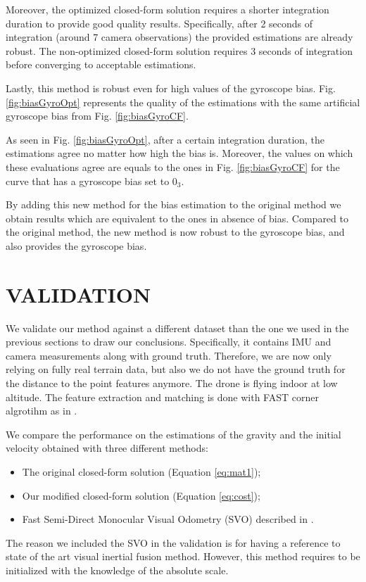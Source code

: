 \documentclass[letterpaper, 10 pt, conference]{ieeeconf}  %
\begin{document}
Moreover, the optimized closed-form solution requires a shorter integration duration to provide good quality results.
Specifically, after 2 seconds of integration (around 7 camera observations) the provided estimations are already robust.
The non-optimized closed-form solution requires 3 seconds of integration before converging to acceptable estimations.


Lastly, this method is robust even for high values of the gyroscope bias.
Fig. \ref{fig:biasGyroOpt} represents the quality of the estimations with the same artificial gyroscope bias from Fig. \ref{fig:biasGyroCF}.



As seen in Fig. \ref{fig:biasGyroOpt}, after a certain integration duration, the estimations agree no matter how high the bias is.
Moreover, the values on which these evaluations agree are equals to the ones in Fig. \ref{fig:biasGyroCF} for the curve that has a gyroscope bias set to $0_3$.


By adding this new method for the bias estimation to the original method we obtain results which are equivalent to the ones in absence of bias.
Compared to the original method, the new method is now robust to the gyroscope bias, and also provides the gyroscope bias.

\section{VALIDATION}

We validate our method against a different dataset than the one we used in the previous sections to draw our conclusions.
Specifically, it contains IMU and camera measurements along with ground truth.
Therefore, we are now only relying on fully real terrain data,
but also we do not have the ground truth for the distance to the point features anymore.
The drone is flying indoor at low altitude.
The feature extraction and matching is done with FAST corner algrotihm as in \cite{Forster2014}.

We compare the performance on the estimations of the gravity and the initial velocity obtained with three different methods:
\begin{itemize}
\item The original closed-form solution (Equation \ref{eq:mat1});
\item Our modified closed-form solution (Equation \ref{eq:cost});
\item Fast Semi-Direct Monocular Visual Odometry (SVO) described in \cite{Forster2014}.
\end{itemize}
The reason we included the SVO in the validation is for having a reference to state of the art visual inertial fusion method.
However, this method requires to be initialized with the knowledge of the absolute scale.
\end{document}
